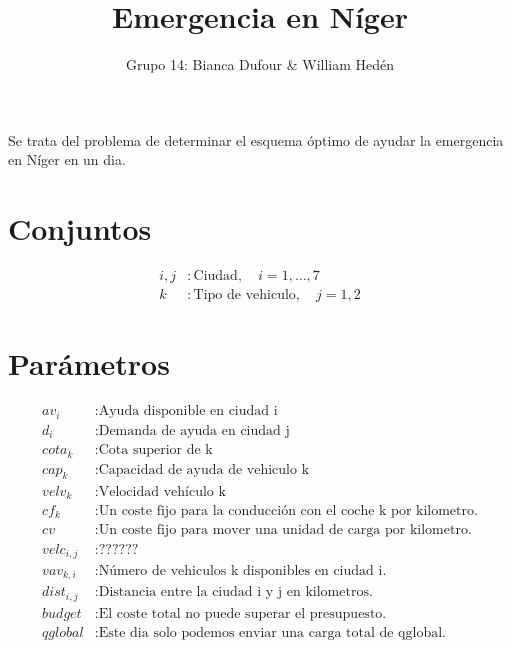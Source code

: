 \documentclass[]{article}
\title{Emergencia en Níger}
\author{Grupo 14: Bianca Dufour \& William Hedén}
\begin{document}
\maketitle

\noindent Se trata del problema de determinar el esquema óptimo de ayudar la emergencia en Níger en un dia.
\section{Conjuntos}
\begin{align*}
	i,j&: \text{Ciudad}, \quad i=1,\dots,7\\
	k&: \text{Tipo de vehiculo}, \quad j=1, 2
\end{align*}

\section{Parámetros}
\begin{align*}
	av_i &: \text{Ayuda disponible en ciudad i}\\
	d_i &: \text{Demanda de ayuda en ciudad j}\\
	cota_k &: \text{Cota superior de k}\\
	cap_k &: \text{Capacidad de ayuda de vehiculo k}\\
	velv_k &: \text{Velocidad vehículo k}\\
	cf_k &: \text{Un coste fijo para la conducción con el coche k por kilometro.}\\
	cv &: \text{Un coste fijo para mover una unidad de carga por kilometro.}\\
	velc_{i,j} &: \text{??????}\\
	vav_{k,i} &: \text{Número de vehiculos k disponibles en ciudad i.}\\
	dist_{i,j} &: \text{Distancia entre la ciudad i y j en kilometros.}\\
	budget &: \text{El coste total no puede superar el presupuesto.}\\
	qglobal &: \text{Este dia solo podemos enviar una carga total de qglobal.}
\end{align*}
\end{document}
